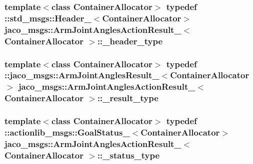 \subsubsection[{\texorpdfstring{\+\_\+header\+\_\+type}{_header_type}}]{\setlength{\rightskip}{0pt plus 5cm}template$<$class Container\+Allocator$>$ typedef \+::std\+\_\+msgs\+::\+Header\+\_\+$<$Container\+Allocator$>$ {\bf jaco\+\_\+msgs\+::\+Arm\+Joint\+Angles\+Action\+Result\+\_\+}$<$ Container\+Allocator $>$\+::{\bf \+\_\+header\+\_\+type}}\hypertarget{structjaco__msgs_1_1ArmJointAnglesActionResult___a142970b220d568f61b0c132b07053d54}{}\label{structjaco__msgs_1_1ArmJointAnglesActionResult___a142970b220d568f61b0c132b07053d54}
\subsubsection[{\texorpdfstring{\+\_\+result\+\_\+type}{_result_type}}]{\setlength{\rightskip}{0pt plus 5cm}template$<$class Container\+Allocator$>$ typedef \+::{\bf jaco\+\_\+msgs\+::\+Arm\+Joint\+Angles\+Result\+\_\+}$<$Container\+Allocator$>$ {\bf jaco\+\_\+msgs\+::\+Arm\+Joint\+Angles\+Action\+Result\+\_\+}$<$ Container\+Allocator $>$\+::{\bf \+\_\+result\+\_\+type}}\hypertarget{structjaco__msgs_1_1ArmJointAnglesActionResult___a50db46393a0ea3c38ea8de5debd933c7}{}\label{structjaco__msgs_1_1ArmJointAnglesActionResult___a50db46393a0ea3c38ea8de5debd933c7}
\subsubsection[{\texorpdfstring{\+\_\+status\+\_\+type}{_status_type}}]{\setlength{\rightskip}{0pt plus 5cm}template$<$class Container\+Allocator$>$ typedef \+::actionlib\+\_\+msgs\+::\+Goal\+Status\+\_\+$<$Container\+Allocator$>$ {\bf jaco\+\_\+msgs\+::\+Arm\+Joint\+Angles\+Action\+Result\+\_\+}$<$ Container\+Allocator $>$\+::{\bf \+\_\+status\+\_\+type}}\hypertarget{structjaco__msgs_1_1ArmJointAnglesActionResult___a55b4d92b3d825dc61be7afb680264c3d}{}\label{structjaco__msgs_1_1ArmJointAnglesActionResult___a55b4d92b3d825dc61be7afb680264c3d}
